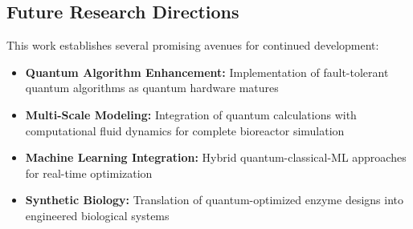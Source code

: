 \subsection{Future Research Directions}

This work establishes several promising avenues for continued development:

\begin{itemize}
\item \textbf{Quantum Algorithm Enhancement:} Implementation of fault-tolerant quantum algorithms as quantum hardware matures
\item \textbf{Multi-Scale Modeling:} Integration of quantum calculations with computational fluid dynamics for complete bioreactor simulation
\item \textbf{Machine Learning Integration:} Hybrid quantum-classical-ML approaches for real-time optimization
\item \textbf{Synthetic Biology:} Translation of quantum-optimized enzyme designs into engineered biological systems
\end{itemize}